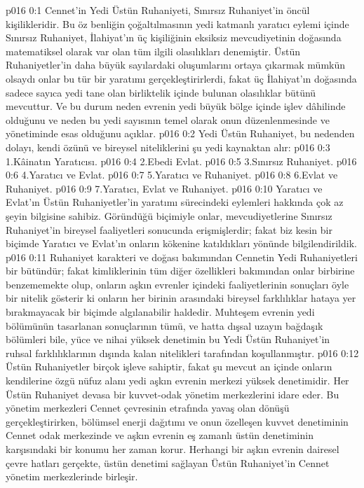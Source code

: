 \vs p016 0:1 Cennet’in Yedi Üstün Ruhaniyeti, Sınırsız Ruhaniyet’in öncül kişilikleridir. Bu öz benliğin çoğaltılmasının yedi katmanlı yaratıcı eylemi içinde Sınırsız Ruhaniyet, İlahiyat’ın üç kişiliğinin eksiksiz mevcudiyetinin doğasında matematiksel olarak var olan tüm ilgili olasılıkları denemiştir. Üstün Ruhaniyetler’in daha büyük sayılardaki oluşumlarını ortaya çıkarmak mümkün olsaydı onlar bu tür bir yaratımı gerçekleştirirlerdi, fakat üç İlahiyat’ın doğasında sadece sayıca yedi tane olan birliktelik içinde bulunan olasılıklar bütünü mevcuttur. Ve bu durum neden evrenin yedi büyük bölge içinde işlev dâhilinde olduğunu ve neden bu yedi sayısının temel olarak onun düzenlenmesinde ve yönetiminde esas olduğunu açıklar.
\vs p016 0:2 Yedi Üstün Ruhaniyet, bu nedenden dolayı, kendi özünü ve bireysel niteliklerini şu yedi kaynaktan alır:
\vs p016 0:3 1.\bibnobreakspace Kâinatın Yaratıcısı.
\vs p016 0:4 2.\bibnobreakspace Ebedi Evlat.
\vs p016 0:5 3.\bibnobreakspace Sınırsız Ruhaniyet.
\vs p016 0:6 4.\bibnobreakspace Yaratıcı ve Evlat.
\vs p016 0:7 5.\bibnobreakspace Yaratıcı ve Ruhaniyet.
\vs p016 0:8 6.\bibnobreakspace Evlat ve Ruhaniyet.
\vs p016 0:9 7.\bibnobreakspace Yaratıcı, Evlat ve Ruhaniyet.
\vs p016 0:10 Yaratıcı ve Evlat’ın Üstün Ruhaniyetler’in yaratımı sürecindeki eylemleri hakkında çok az şeyin bilgisine sahibiz. Göründüğü biçimiyle onlar, mevcudiyetlerine Sınırsız Ruhaniyet’in bireysel faaliyetleri sonucunda erişmişlerdir; fakat biz kesin bir biçimde Yaratıcı ve Evlat’ın onların kökenine katıldıkları yönünde bilgilendirildik.
\vs p016 0:11 Ruhaniyet karakteri ve doğası bakımından Cennetin Yedi Ruhaniyetleri bir bütündür; fakat kimliklerinin tüm diğer özellikleri bakımından onlar birbirine benzememekte olup, onların aşkın evrenler içindeki faaliyetlerinin sonuçları öyle bir nitelik gösterir ki onların her birinin arasındaki bireysel farklılıklar hataya yer bırakmayacak bir biçimde algılanabilir haldedir. Muhteşem evrenin yedi bölümünün tasarlanan sonuçlarının tümü, ve hatta dışsal uzayın bağdaşık bölümleri bile, yüce ve nihai yüksek denetimin bu Yedi Üstün Ruhaniyet’in ruhsal farklılıklarının dışında kalan nitelikleri tarafından koşullanmıştır.
\vs p016 0:12 Üstün Ruhaniyetler birçok işleve sahiptir, fakat şu mevcut an içinde onların kendilerine özgü nüfuz alanı yedi aşkın evrenin merkezi yüksek denetimidir. Her Üstün Ruhaniyet devasa bir kuvvet\hyp{}odak yönetim merkezlerini idare eder. Bu yönetim merkezleri Cennet çevresinin etrafında yavaş olan dönüşü gerçekleştirirken, bölümsel enerji dağıtımı ve onun özelleşen kuvvet denetiminin Cennet odak merkezinde ve aşkın evrenin eş zamanlı üstün denetiminin karşısındaki bir konumu her zaman korur. Herhangi bir aşkın evrenin dairesel çevre hatları gerçekte, üstün denetimi sağlayan Üstün Ruhaniyet’in Cennet yönetim merkezlerinde birleşir.
